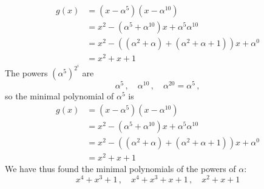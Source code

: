 \documentclass[11pt]{article}
\begin{document}
\begin{itemize}
    \begin{align*}
      g(x) &= (x-\alpha^5)(x-\alpha^{10})\\
           &= x^2 - (\alpha^5+\alpha^{10})x + \alpha^5\alpha^{10}\\
           &= x^2 - ((\alpha^2+\alpha) + (\alpha^2 + \alpha + 1))x + \alpha^0\\
           &= x^2 + x + 1
    \end{align*}
    The powers $(\alpha^5)^{2^i}$ are
    \[
      \alpha^5\,,\quad
      \alpha^{10}\,,\quad
      \alpha^{20} = \alpha^5\,,
    \]
    so the minimal polynomial of $\alpha^5$ is
    \begin{align*}
      g(x) &= (x-\alpha^5)(x-\alpha^{10})\\
           &= x^2 - (\alpha^5+\alpha^{10})x + \alpha^5\alpha^{10}\\
           &= x^2 - ((\alpha^2+\alpha) + (\alpha^2 + \alpha + 1))x + \alpha^0\\
           &= x^2 + x + 1
    \end{align*}
    We have thus found the minimal polynomials of the powers of $\alpha$:
    \[
      x^4 + x^3 + 1\,,\quad x^4 + x^3 + x + 1\,,\quad x^2 + x + 1
    \]
\end{itemize}
\end{document}
